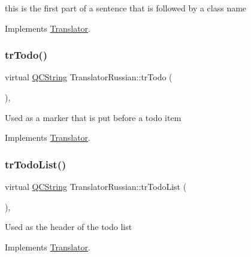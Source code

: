 this is the first part of a sentence that is followed by a class name 

Implements \mbox{\hyperlink{class_translator}{Translator}}.

\mbox{\label{class_translator_russian_a82bb8094ab01cda3eaf6df1a37b22f1b}} 
\subsubsection{\texorpdfstring{trTodo()}{trTodo()}}
{\footnotesize\ttfamily virtual \mbox{\hyperlink{class_q_c_string}{Q\+C\+String}} Translator\+Russian\+::tr\+Todo (\begin{DoxyParamCaption}{ }\end{DoxyParamCaption})\hspace{0.3cm}{\ttfamily [inline]}, {\ttfamily [virtual]}}

Used as a marker that is put before a todo item 

Implements \mbox{\hyperlink{class_translator}{Translator}}.

\mbox{\label{class_translator_russian_a430e608307a8006bb7d1e3583fa7c9ae}} 
\subsubsection{\texorpdfstring{trTodoList()}{trTodoList()}}
{\footnotesize\ttfamily virtual \mbox{\hyperlink{class_q_c_string}{Q\+C\+String}} Translator\+Russian\+::tr\+Todo\+List (\begin{DoxyParamCaption}{ }\end{DoxyParamCaption})\hspace{0.3cm}{\ttfamily [inline]}, {\ttfamily [virtual]}}

Used as the header of the todo list 

Implements \mbox{\hyperlink{class_translator}{Translator}}.

\mbox{\label{class_translator_russian_a158267d6a992d54322edbfcdc88053ee}} 
